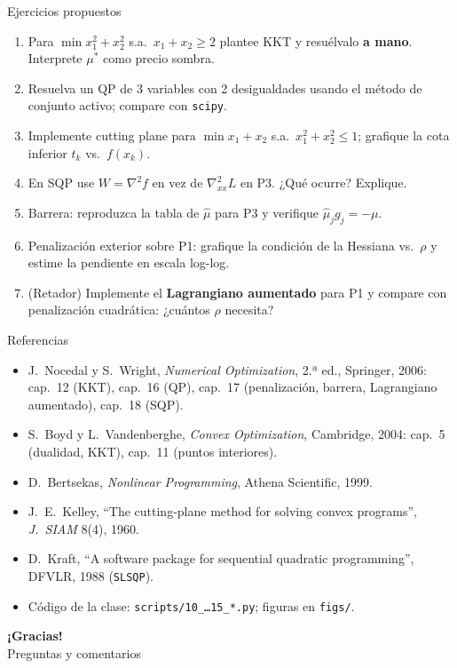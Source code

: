 \documentclass[aspectratio=169]{beamer}
\newcommand{\grad}{\nabla}
\begin{document}
\begin{frame}{Ejercicios propuestos}
  \small
  \begin{enumerate}
    \item Para $\min x_1^2+x_2^2$ s.a.\ $x_1+x_2\ge2$ plantee KKT y resuélvalo \textbf{a mano}. Interprete $\mu^\ast$ como precio sombra.
    \item Resuelva un QP de 3 variables con 2 desigualdades usando el método de conjunto activo; compare con \texttt{scipy}.
    \item Implemente cutting plane para $\min x_1+x_2$ s.a.\ $x_1^2+x_2^2\le1$; grafique la cota inferior $t_k$ vs.\ $f(x_k)$.
    \item En SQP use $W=\grad^2f$ en vez de $\grad^2_{xx}L$ en P3. ¿Qué ocurre? Explique.
    \item Barrera: reproduzca la tabla de $\hat\mu$ para P3 y verifique $\hat\mu_j g_j=-\mu$.
    \item Penalización exterior sobre P1: grafique la condición de la Hessiana vs.\ $\rho$ y estime la pendiente en escala log-log.
    \item (Retador) Implemente el \textbf{Lagrangiano aumentado} para P1 y compare con penalización cuadrática: ¿cuántos $\rho$ necesita?
  \end{enumerate}
\end{frame}

\begin{frame}{Referencias}
  \small
  \begin{itemize}
    \item J.\ Nocedal y S.\ Wright, \emph{Numerical Optimization}, 2.ª ed., Springer, 2006: cap.~12 (KKT), cap.~16 (QP), cap.~17 (penalización, barrera, Lagrangiano aumentado), cap.~18 (SQP).
    \item S.\ Boyd y L.\ Vandenberghe, \emph{Convex Optimization}, Cambridge, 2004: cap.~5 (dualidad, KKT), cap.~11 (puntos interiores).
    \item D.\ Bertsekas, \emph{Nonlinear Programming}, Athena Scientific, 1999.
    \item J.\ E.\ Kelley, ``The cutting-plane method for solving convex programs'', \emph{J.\ SIAM} 8(4), 1960.
    \item D.\ Kraft, ``A software package for sequential quadratic programming'', DFVLR, 1988 (\texttt{SLSQP}).
    \item Código de la clase: \texttt{scripts/10\_\dots15\_\textit{*}.py}; figuras en \texttt{figs/}.
  \end{itemize}
\end{frame}

\begin{frame}[plain]
  \centering\vfill
  {\Large\bfseries ¡Gracias!}\\[0.4cm]
  Preguntas y comentarios\vfill
\end{frame}
\end{document}
